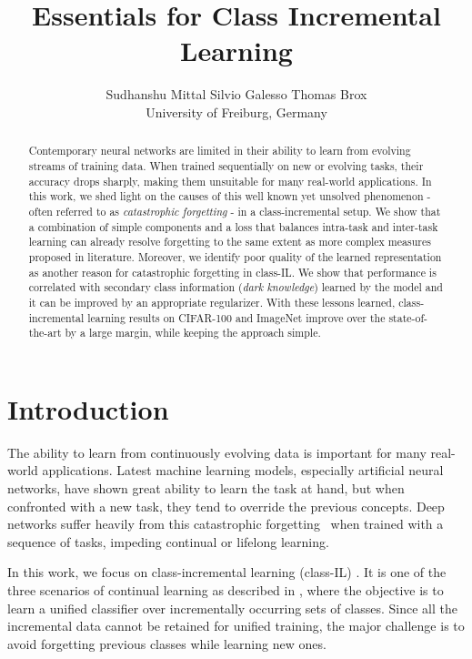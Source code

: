 \documentclass[final]{cvpr}
\begin{document}
\title{Essentials for Class Incremental Learning}

\author{Sudhanshu Mittal \qquad Silvio Galesso   \qquad Thomas Brox \\  University of Freiburg, Germany}

\maketitle

\begin{abstract}
Contemporary neural networks are limited in their ability to learn from evolving streams of training data. When trained sequentially on new or evolving tasks, their accuracy drops sharply, making them unsuitable for many real-world applications. 
In this work, we shed light on the causes of this well known yet unsolved phenomenon - often referred to as \textit{catastrophic forgetting} - in a class-incremental setup.
We show that a combination of simple components and a loss that balances intra-task and inter-task learning can already resolve forgetting to the same extent as more complex measures proposed in literature.
Moreover, we identify poor quality of the learned representation as another reason for catastrophic forgetting in class-IL. We show that performance is correlated with secondary class information (\textit{dark knowledge}) learned by the model and it can be improved by an appropriate regularizer. With these lessons learned, class-incremental learning results on CIFAR-100 and ImageNet improve over the state-of-the-art by a large margin, while keeping the approach simple. 
\end{abstract}

\section{Introduction}



The ability to learn from continuously evolving data is important for many real-world applications.
Latest machine learning models, especially artificial neural networks, have shown great ability to learn the task at hand, but when confronted with a new task, they tend to override the previous concepts. Deep networks suffer heavily from this catastrophic forgetting~\cite{mccloskey:catastrophic} when trained with a sequence of tasks, impeding continual or lifelong learning.

In this work, we focus on class-incremental learning (class-IL) \cite{icarl}. It is one of the three scenarios of continual learning as described in \cite{1904.07734}, where the objective is to learn a unified classifier over incrementally occurring sets of classes. Since all the incremental data cannot be retained for unified training, the major challenge is to avoid forgetting previous classes while learning new ones.  
\end{document}

